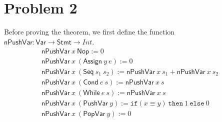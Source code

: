 \documentclass[letter, notitlepage]{article}
\begin{document}
\begin{center}
\DP
~~~
\DP
\end{center}

\begin{center}
 
\DP
\end{center}

\begin{center}
 
\DP
\end{center}

\begin{center}
\DP
~~~
\DP
\end{center}

\section{Problem 2}
Before proving the theorem, we first define the function $\mathsf{nPushVar}:\mathsf{Var}\to \mathsf{Stmt} \to Int$.
\[
\begin{array}{l}
	\mathsf{nPushVar}~x~\mathsf{Nop}  := 0 \\
	\mathsf{nPushVar}~x~(\mathsf{Assign}~y~e) := 0\\
	\mathsf{nPushVar}~x~(\mathsf{Seq}~s_1~s_2)  := \mathsf{nPushVar}~x~s_1 + \mathsf{nPushVar}~x~s_2\\
	\mathsf{nPushVar}~x~(\mathsf{Cond}~e~s)  := \mathsf{nPushVar}~x~s\\
	\mathsf{nPushVar}~x~(\mathsf{While}~e~s)  := \mathsf{nPushVar}~x~s\\
	\mathsf{nPushVar}~x~(\mathsf{PushVar}~y)  := \mathtt{if}(x\equiv y)~\mathtt{then}~1~\mathtt{else}~0\\
	\mathsf{nPushVar}~x~(\mathsf{PopVar}~y) := 0
\end{array}
\]
\end{document}
